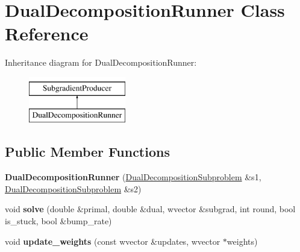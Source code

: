 \hypertarget{classDualDecompositionRunner}{
\section{DualDecompositionRunner Class Reference}
\label{classDualDecompositionRunner}
}
Inheritance diagram for DualDecompositionRunner:\begin{figure}[H]
\begin{center}
\leavevmode
\includegraphics[height=2cm]{classDualDecompositionRunner}
\end{center}
\end{figure}
\subsection*{Public Member Functions}
\begin{DoxyCompactItemize}
\item 
\hypertarget{classDualDecompositionRunner_ad0af4c8b1a73612770d329cf560af9d1}{
{\bfseries DualDecompositionRunner} (\hyperlink{classDualDecompositionSubproblem}{DualDecompositionSubproblem} \&s1, \hyperlink{classDualDecompositionSubproblem}{DualDecompositionSubproblem} \&s2)}
\label{classDualDecompositionRunner_ad0af4c8b1a73612770d329cf560af9d1}

\item 
\hypertarget{classDualDecompositionRunner_a4bcec895359acf32000d42155c4593ef}{
void {\bfseries solve} (double \&primal, double \&dual, wvector \&subgrad, int round, bool is\_\-stuck, bool \&bump\_\-rate)}
\label{classDualDecompositionRunner_a4bcec895359acf32000d42155c4593ef}

\item 
\hypertarget{classDualDecompositionRunner_a3cdf7ce33f6454f9fee9fb9c3287c5ac}{
void {\bfseries update\_\-weights} (const wvector \&updates, wvector $\ast$weights)}
\label{classDualDecompositionRunner_a3cdf7ce33f6454f9fee9fb9c3287c5ac}

\end{DoxyCompactItemize}
